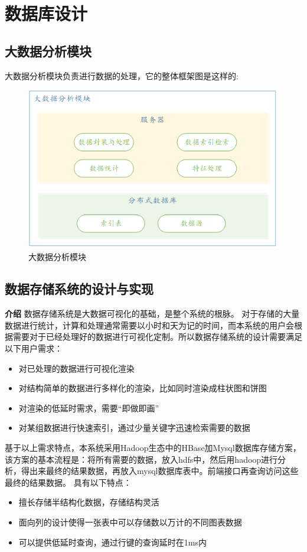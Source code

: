 \newpage
\section{数据库设计}

\subsection{大数据分析模块}
大数据分析模块负责进行数据的处理，它的整体框架图是这样的:
\begin{figure}[!htbp]
	\centering
	\includegraphics[scale=1.2]{image/d1.png}
	\caption{大数据分析模块}
\end{figure}

\subsection{数据存储系统的设计与实现}
\textbf{介绍}
数据存储系统是大数据可视化的基础，是整个系统的根脉。
对于存储的大量数据进行统计，计算和处理通常需要以小时和天为记的时间，而本系统的用户会根据需要对于已经处理好的数据进行可视化定制。所以数据存储系统的设计需要满足以下用户需求：
\begin{itemize}
	\item 对已处理的数据进行可视化渲染
	\item 对结构简单的数据进行多样化的渲染，比如同时渲染成柱状图和饼图
	\item 对渲染的低延时需求，需要“即做即画”
	\item 对某组数据进行快速索引，通过少量关键字迅速检索需要的数据
\end{itemize}

基于以上需求特点，本系统采用Hadoop生态中的HBase加Mysql数据库存储方案，该方案的基本流程是：将所有需要的数据，放入hdfs中，然后用hadoop进行分析，得出来最终的结果数据，再放入mysql数据库表中。前端接口再查询访问这些最终的结果数据。
具有以下特点：
\begin{itemize}
	\item 擅长存储半结构化数据，存储结构灵活
	\item 面向列的设计使得一张表中可以存储数以万计的不同图表数据
	\item 可以提供低延时查询，通过行键的查询延时在1ms内
\end{itemize}

